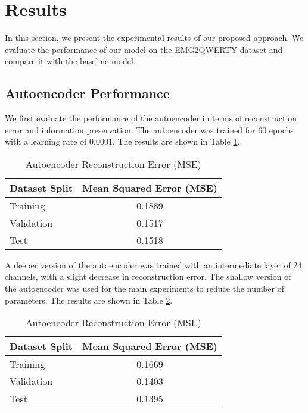 \section{Results}

In this section, we present the experimental results of our proposed approach. We evaluate the performance of our model on the EMG2QWERTY dataset and compare it with the baseline model.

\subsection{Autoencoder Performance}

We first evaluate the performance of the autoencoder in terms of reconstruction error and information preservation. The autoencoder was trained for 60 epochs with a learning rate of 0.0001. The results are shown in Table \ref{tab:autoencoder_mse}.

\begin{table}[h]
    \centering
    \caption{Autoencoder Reconstruction Error (MSE)}
    \begin{tabular}{lc}
        \hline
        \textbf{Dataset Split} & \textbf{Mean Squared Error (MSE)} \\
        \hline
        Training               & 0.1889                            \\
        Validation             & 0.1517                            \\
        Test                   & 0.1518                            \\
        \hline
    \end{tabular}
    \label{tab:autoencoder_mse}
\end{table}

A deeper version of the autoencoder was trained with an intermediate layer of 24 channels, with a slight decrease in reconstruction error. The shallow version of the autoencoder was used for the main experiments to reduce the number of parameters. The results are shown in Table \ref{tab:autoencoder_mse_deep}.

\begin{table}[h]
    \centering
    \caption{Autoencoder Reconstruction Error (MSE)}
    \begin{tabular}{lc}
        \hline
        \textbf{Dataset Split} & \textbf{Mean Squared Error (MSE)} \\
        \hline
        Training               & 0.1669                            \\
        Validation             & 0.1403                            \\
        Test                   & 0.1395                            \\
        \hline
    \end{tabular}
    \label{tab:autoencoder_mse_deep}
\end{table}

